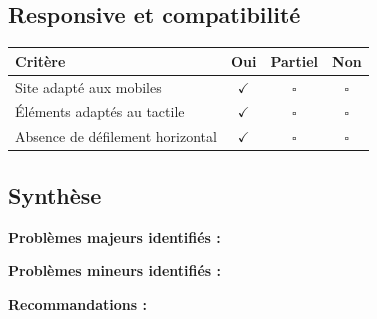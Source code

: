 \documentclass[11pt,a4paper]{article}
\begin{document}
\subsection*{Responsive et compatibilité}

\begin{longtable}{|p{9cm}|c|c|c|}
\hline
\textbf{Critère} & \textbf{Oui} & \textbf{Partiel} & \textbf{Non} \\ \hline
\endhead
Site adapté aux mobiles & $\checkmark$ & $\square$ & $\square$ \\ \hline
Éléments adaptés au tactile & $\checkmark$ & $\square$ & $\square$ \\ \hline
Absence de défilement horizontal & $\checkmark$ & $\square$ & $\square$ \\ \hline
\end{longtable}

\subsection*{Synthèse}

\vspace{0.5cm}

\noindent\textbf{Problèmes majeurs identifiés :}

\vspace{2cm}

\noindent\textbf{Problèmes mineurs identifiés :}

\vspace{2cm}

\noindent\textbf{Recommandations :}

\vspace{3cm}
\end{document}

